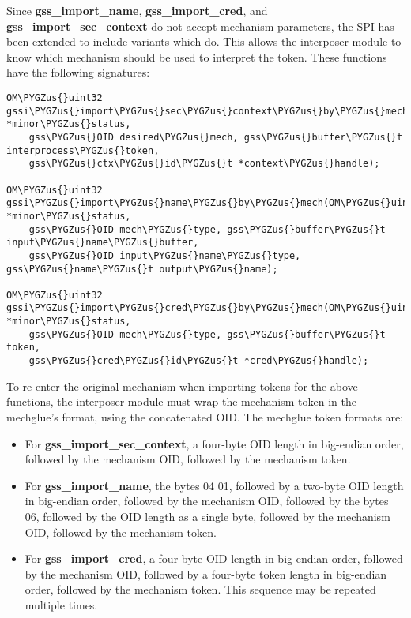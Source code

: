 \documentclass[letterpaper,10pt,english]{sphinxmanual}
\def\PYGZus{\char`\_}
\begin{document}
Since \textbf{gss\_import\_name}, \textbf{gss\_import\_cred}, and
\textbf{gss\_import\_sec\_context} do not accept mechanism parameters, the SPI
has been extended to include variants which do.  This allows the
interposer module to know which mechanism should be used to interpret
the token.  These functions have the following signatures:

\begin{Verbatim}[commandchars=\\\{\}]
OM\PYGZus{}uint32 gssi\PYGZus{}import\PYGZus{}sec\PYGZus{}context\PYGZus{}by\PYGZus{}mech(OM\PYGZus{}uint32 *minor\PYGZus{}status,
    gss\PYGZus{}OID desired\PYGZus{}mech, gss\PYGZus{}buffer\PYGZus{}t interprocess\PYGZus{}token,
    gss\PYGZus{}ctx\PYGZus{}id\PYGZus{}t *context\PYGZus{}handle);

OM\PYGZus{}uint32 gssi\PYGZus{}import\PYGZus{}name\PYGZus{}by\PYGZus{}mech(OM\PYGZus{}uint32 *minor\PYGZus{}status,
    gss\PYGZus{}OID mech\PYGZus{}type, gss\PYGZus{}buffer\PYGZus{}t input\PYGZus{}name\PYGZus{}buffer,
    gss\PYGZus{}OID input\PYGZus{}name\PYGZus{}type, gss\PYGZus{}name\PYGZus{}t output\PYGZus{}name);

OM\PYGZus{}uint32 gssi\PYGZus{}import\PYGZus{}cred\PYGZus{}by\PYGZus{}mech(OM\PYGZus{}uint32 *minor\PYGZus{}status,
    gss\PYGZus{}OID mech\PYGZus{}type, gss\PYGZus{}buffer\PYGZus{}t token,
    gss\PYGZus{}cred\PYGZus{}id\PYGZus{}t *cred\PYGZus{}handle);
\end{Verbatim}

To re-enter the original mechanism when importing tokens for the above
functions, the interposer module must wrap the mechanism token in the
mechglue's format, using the concatenated OID.  The mechglue token
formats are:
\begin{itemize}
\item {} 
For \textbf{gss\_import\_sec\_context}, a four-byte OID length in big-endian
order, followed by the mechanism OID, followed by the mechanism
token.

\item {} 
For \textbf{gss\_import\_name}, the bytes 04 01, followed by a two-byte OID
length in big-endian order, followed by the mechanism OID, followed
by the bytes 06, followed by the OID length as a single byte,
followed by the mechanism OID, followed by the mechanism token.

\item {} 
For \textbf{gss\_import\_cred}, a four-byte OID length in big-endian order,
followed by the mechanism OID, followed by a four-byte token length
in big-endian order, followed by the mechanism token.  This sequence
may be repeated multiple times.

\end{itemize}
\end{document}
